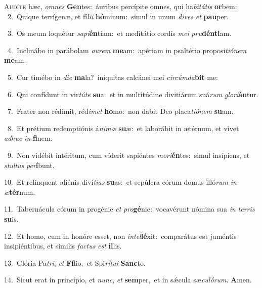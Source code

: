 \lettrine{\initial\textcolor{\initialcolor}{A}}{udíte} hæc, \textit{om}\-\textit{nes} \textbf{Gen}\-tes:~\star áuribus percípite omnes, qui ha\-\textit{bi}\-\textit{tá}\textit{tis} \textbf{or}\-bem:\\
{\numbfont\textcolor{\numbcolor}{~2.}}~Quique terrígenæ, et fí\-\textit{li}\-\textit{i} \textbf{hó}\-minum:~\star simul in unum \textit{di}\-\textit{ves} \textit{et} \textbf{pau}\-per.\par
{\numbfont\textcolor{\numbcolor}{~3.}}~Os meum loquétur \textit{sa}\-\textit{pi}\textbf{én}tiam:~\star et meditátio cordis \textit{me}\-\textit{i} \textit{pru}\-\textbf{dén}\textbf{ti}am.\par
{\numbfont\textcolor{\numbcolor}{~4.}}~Inclinábo in parábolam \textit{au}\-\textit{rem} \textbf{me}\-am:~\star apériam in psaltério proposi\-\textit{ti}\-\textit{ó}\textit{nem} \textbf{me}\-am.\par
{\numbfont\textcolor{\numbcolor}{~5.}}~Cur timébo in \textit{di}\-\textit{e} \textbf{ma}\-la?~\star iníquitas calcánei mei \textit{cir}\-\textit{cúm}\textit{da}\textbf{bit} me:\par
{\numbfont\textcolor{\numbcolor}{~6.}}~Qui confídunt in vir\-\textit{tú}\-\textit{te} \textbf{su}\-a:~\star et in multitúdine divitiárum suá\textit{rum} \textit{glo}\-\textit{ri}\textbf{án}tur.\par
{\numbfont\textcolor{\numbcolor}{~7.}}~Frater non rédimit, réd\-\textit{i}\-\textit{met} \textbf{ho}\-mo:~\star non dabit Deo placa\-\textit{ti}\-\textit{ó}\textit{nem} \textbf{su}\-am.\par
{\numbfont\textcolor{\numbcolor}{~8.}}~Et prétium redemptiónis á\-\textit{ni}\-\textit{mæ} \textbf{su}\-æ:~\star et laborábit in ætérnum, et vivet \textit{ad}\-\textit{huc} \textit{in} \textbf{fi}\-nem.\par
{\numbfont\textcolor{\numbcolor}{~9.}}~Non vidébit intéritum, cum víderit sapiéntes \textit{mo}\-\textit{ri}\textbf{én}tes:~\star simul insípiens, et \textit{stul}\-\textit{tus} \textit{per}\-\textbf{í}bunt.\par
{\numbfont\textcolor{\numbcolor}{10.}}~Et relínquent aliénis diví\-\textit{ti}\-\textit{as} \textbf{su}\-as:~\star et sepúlcra eórum domus illó\textit{rum} \textit{in} \textit{æ}\-\textbf{tér}num.\par
{\numbfont\textcolor{\numbcolor}{11.}}~Tabernácula eórum in progénie \textit{et} \textit{pro}\-\textbf{gé}nie:~\star vocavérunt nómina sua \textit{in} \textit{ter}\-\textit{ris} \textbf{su}\-is.\par
{\numbfont\textcolor{\numbcolor}{12.}}~Et homo, cum in honóre esset, non \textit{in}\-\textit{tel}\textbf{lé}xit:~\star comparátus est juméntis insipiéntibus, et símilis \textit{fac}\-\textit{tus} \textit{est} \textbf{il}\-lis.\par
{\numbfont\textcolor{\numbcolor}{13.}}~Glória Pa\-\textit{tri}\-, \textit{et} \textbf{Fí}\-lio,~\star et Spi\-\textit{rí}\-\textit{tu}\textit{i} \textbf{Sanc}\-to.\par
{\numbfont\textcolor{\numbcolor}{14.}}~Sicut erat in princípio, et \textit{nunc}\-, \textit{et} \textbf{sem}\-per,~\star et in sǽcula sæ\-\textit{cu}\-\textit{ló}\textit{rum}. \textbf{A}\-men.\par
